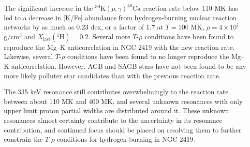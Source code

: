 The significant increase in the $^{39}\mathrm{K}(p, \gamma)^{40}\mathrm{Ca}$ reaction rate below 110 MK has led to a decrease in [K/Fe] abundance from hydrogen-burning nuclear reaction networks by as much as 0.23 dex, or a factor of 1.7 at $T=100$ MK, $\rho = 4 \times 10^{7}$ $\mathrm{g}/\mathrm{cm}^{3}$ and $X_{\mathrm{last}}(^{1}\mathrm{H}) = 0.2$. Several more $T$-$\rho$ conditions have been found to reproduce the Mg--K anticorrelation in NGC 2419 with the new reaction rate. Likewise, several $T$-$\rho$ conditions have been found to no longer reproduce the Mg--K anticorrelation. However, AGB and SAGB stars have not been found to be any more likely polluter star candidates than with the previous reaction rate.

The 335 keV resonance still contributes overwhelmingly to the reaction rate between about 110 MK and 400 MK, and several unknown resonances with only upper limit proton partial widths are distributed around it. These unknown resonances almost certainty contribute to the uncertainty in its resonance contribution, and continued focus should be placed on resolving them to further constrain the $T$-$\rho$ conditions for hydrogen burning in NGC 2419.

